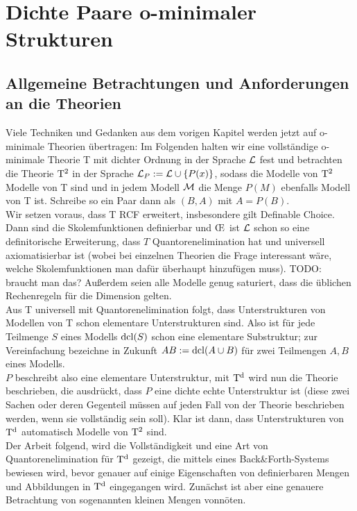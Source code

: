 \chapter{Dichte Paare o-minimaler Strukturen}
\section{Allgemeine Betrachtungen und Anforderungen an die Theorien}

Viele Techniken und Gedanken aus dem vorigen Kapitel werden jetzt auf o-minimale Theorien übertragen: Im Folgenden halten wir eine vollständige o-minimale Theorie T mit dichter Ordnung in der Sprache $\mathcal{L}$ fest und betrachten die Theorie $\operatorname{T^2}$ in der Sprache $\mathcal{L}_P:=\mathcal{L}\cup\{P(x)\}$, sodass die Modelle von $\operatorname{T^2}$ Modelle von T sind und in jedem Modell $\mathcal{M}$ die Menge $P(M)$ ebenfalls Modell von T ist. Schreibe so ein Paar dann als $(B,A)$ mit $A=P(B)$.\\
Wir setzen voraus, dass T RCF erweitert, insbesondere gilt Definable Choice. Dann sind die Skolemfunktionen definierbar und \OE\ ist $\mathcal{L}$ schon so eine definitorische Erweiterung, dass $T$ Quantorenelimination hat und universell axiomatisierbar ist (wobei bei einzelnen Theorien die Frage interessant wäre, welche Skolemfunktionen man dafür überhaupt hinzufügen muss). TODO: braucht man das? Außerdem seien alle Modelle genug saturiert, dass die üblichen Rechenregeln für die Dimension gelten.\\
Aus T universell mit Quantorenelimination folgt, dass Unterstrukturen von Modellen von T schon elementare Unterstrukturen sind. Also ist für jede Teilmenge $S$ eines Modells $\operatorname{dcl}(S)$ schon eine elementare Substruktur; zur Vereinfachung bezeichne in Zukunft $AB:=\operatorname{dcl}(A\cup B)$ für zwei Teilmengen $A,B$ eines Modells.\\
$P$ beschreibt also eine elementare Unterstruktur, mit $\operatorname{T^d}$ wird nun die Theorie beschrieben, die ausdrückt, dass $P$ eine dichte echte Unterstruktur ist (diese zwei Sachen oder deren Gegenteil müssen auf jeden Fall von der Theorie beschrieben werden, wenn sie vollständig sein soll). Klar ist dann, dass Unterstrukturen von $\operatorname{T^d}$ automatisch Modelle von $\operatorname{T^2}$ sind.\\
Der Arbeit \cite{VanDenDries} folgend, wird die Vollständigkeit und eine Art von Quantorenelimination für $\operatorname{T^d}$ gezeigt, die mittels eines Back\&Forth-Systems bewiesen wird, bevor genauer auf einige Eigenschaften von definierbaren Mengen und Abbildungen in $\operatorname{T^d}$ eingegangen wird. Zunächst ist aber eine genauere Betrachtung von sogenannten kleinen Mengen vonnöten.

